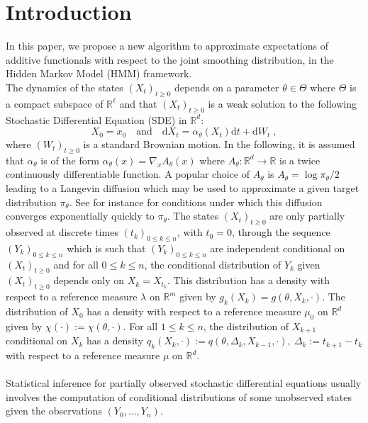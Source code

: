 \documentclass[12pt]{article}
\newcommand{\rmd}{\mathrm{d}}
\newcommand{\eqsp}{\;}
\newcommand{\1}{\mathrm{1}}
\newcommand{\qk}{q_{k}}
\begin{document}
\section{Introduction}
In this paper, we propose a new algorithm to approximate expectations of additive functionals with respect to the joint smoothing distribution, in the Hidden Markov Model (HMM) framework.\\
The dynamics of the states $(X_t)_{t\ge 0}$ depends on a parameter $\theta\in \Theta$ where $\Theta$ is a compact subspace of $\mathbb{R}^{\ell}$ and that $(X_t)_{t\ge 0}$ is a weak solution to the following Stochastic Differential Equation (SDE) in $\mathbb{R}^d$:
\begin{equation}
\label{eq:target:sde}
X_0 = x_0\quad\mbox{and}\quad \rmd X_t = \alpha_{\theta}(X_t)\rmd t + \rmd W_t\eqsp,
\end{equation}
where $(W_t)_{t\ge 0}$ is a standard Brownian motion. In the following, it is assumed that $\alpha_{\theta}$ is of the form $\alpha_{\theta}(x) = \nabla_x A_{\theta}(x)$ where $A_{\theta}: \mathbb{R}^d \to \mathbb{R}$ is a twice continuously differentiable function. 
A popular choice of $A_{\theta}$  is $A_{\theta} = \log \pi_{\theta}/2$ leading to a Langevin diffusion which may be used to approximate a given target distribution $\pi_{\theta}$. See for instance \cite{roberts:tweedie:1996} for conditions under which this diffusion converges exponentially quickly to $\pi_{\theta}$. 
The states $(X_t)_{t\ge 0}$ are only partially observed at discrete times $(t_k)_{0\le k \le n}$, with $t_0=0$, through the sequence $(Y_k)_{0\le k\le n}$ which is such that $(Y_k)_{0\le k\le n}$ are independent conditional on $(X_t)_{t\ge 0}$ and for all $0\le k\le n$, the conditional distribution of $Y_k$ given $(X_t)_{t\ge 0}$ depends only on $X_k = X_{t_k}$. 
This distribution has a density with respect to a reference measure $\lambda$ on $\mathbb{R}^m$ given by $g_k(X_k) = g(\theta,X_k,\cdot)$. 
The distribution of $X_0$ has a density with respect to a reference measure $\mu_0$ on $\mathbb{R}^d$ given by $\chi(\cdot):=\chi(\theta,\cdot)$.
For all $1\le k \le n$, the distribution of $X_{k+1} $ conditional on $X_{k}$ has a density $\qk(X_{k},\cdot) :=q(\theta,\Delta_k,X_{k-1},\cdot),~\Delta_k:=t_{k+1}-t_{k}$ with respect to a reference measure $\mu$ on $\mathbb{R}^d$.\\
\\
Statistical inference for partially observed stochastic differential equations usually involves the computation of conditional distributions of some unobserved states given the observations $(Y_0,\ldots,Y_n)$. 
\end{document}
